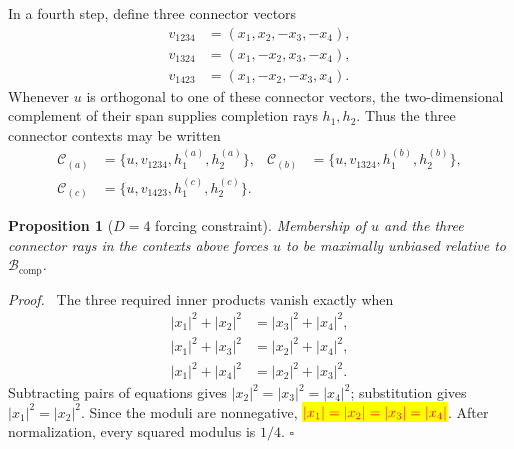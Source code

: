 \documentclass[%
  reprint,
  superscriptaddress,
  showpacs,
  showkeys,
  amsmath,amssymb,
  pra,
  longbibliography,
  floatfix,
  x11names
]{revtex4-2}
\newenvironment{revision}{\begingroup}{\endgroup}
\newcommand{\corrmath}[1]{\begingroup\setlength{\fboxsep}{1pt}\colorbox{yellow}{\ensuremath{\color{red}#1}}\endgroup}
\newtheorem{proposition}{Proposition}
\newenvironment{proof}{\par\noindent\textit{Proof.}\ }{\hfill$\square$\par}
\begin{document}
In a fourth step, define three connector vectors
\begin{align*}
v_{1234}&=(x_1,x_2,-x_3,-x_4),\\
v_{1324}&=(x_1,-x_2,x_3,-x_4),\\
v_{1423}&=(x_1,-x_2,-x_3,x_4).
\end{align*}
\begin{revision}
Whenever $u$ is orthogonal to one of these connector vectors, the two-dimensional complement of their span supplies completion rays $h_1,h_2$.  Thus the three connector contexts may be written
\begin{align*}
\mathcal{C}_{(a)}&=\{u,v_{1234},h^{(a)}_1,h^{(a)}_2\},&
\mathcal{C}_{(b)}&=\{u,v_{1324},h^{(b)}_1,h^{(b)}_2\},\\
\mathcal{C}_{(c)}&=\{u,v_{1423},h^{(c)}_1,h^{(c)}_2\}.
\end{align*}

\begin{proposition}[$D=4$ forcing constraint]
\label{prop:D4forcing}
Membership of $u$ and the three connector rays in the contexts above forces $u$ to be maximally unbiased relative to $\mathcal{B}_{\mathrm{comp}}$.
\end{proposition}

\begin{proof}
The three required inner products vanish exactly when
\begin{align}
|x_1|^2+|x_2|^2&=|x_3|^2+|x_4|^2, \label{eq:D4a}\\
|x_1|^2+|x_3|^2&=|x_2|^2+|x_4|^2, \label{eq:D4b}\\
|x_1|^2+|x_4|^2&=|x_2|^2+|x_3|^2. \label{eq:D4c}
\end{align}
Subtracting pairs of equations gives $|x_2|^2=|x_3|^2=|x_4|^2$; substitution gives $|x_1|^2=|x_2|^2$.  Since the moduli are nonnegative, \corrmath{|x_1|=|x_2|=|x_3|=|x_4|}.  After normalization, every squared modulus is $1/4$.
\end{proof}


\end{revision}
\end{document}
